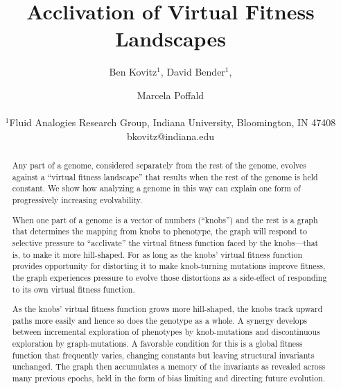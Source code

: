 \documentclass[letterpaper]{article}
\title{Acclivation of Virtual Fitness Landscapes}
\author{Ben Kovitz$^{1}$, David Bender$^{1}$, \and Marcela Poffald \\
\mbox{}\\
$^1$Fluid Analogies Research Group, Indiana University, Bloomington, IN 47408 \\
bkovitz@indiana.edu}
\begin{document}
\maketitle

\begin{abstract}
Any part of a genome, considered separately from the rest of the genome,
evolves against a ``virtual fitness landscape'' that results when the rest of
the genome is held constant. We show how analyzing a genome in this way can
explain one form of progressively increasing evolvability.

When one part of a genome is a vector of numbers (``knobs'') and the rest is a
graph that determines the mapping from knobs to phenotype, the graph will
respond to selective pressure to ``acclivate'' the virtual fitness function
faced by the knobs---that is, to make it more hill-shaped. For as
long as the knobs' virtual fitness function provides opportunity for
distorting it to make knob-turning mutations improve fitness, the graph
experiences pressure to evolve those distortions as a side-effect of
responding to its own virtual fitness function.





As the knobs' virtual fitness function grows more hill-shaped, the knobs track
upward paths more easily and hence so does the genotype as a whole. A synergy
develops between incremental exploration of phenotypes by knob-mutations and
discontinuous exploration by graph-mutations. A favorable condition for this
is a global fitness function that frequently varies, changing constants but
leaving structural invariants unchanged. The graph then accumulates a memory
of the invariants as revealed across many previous epochs, held in the form of
bias limiting and directing future evolution.
\end{abstract}
\end{document}
